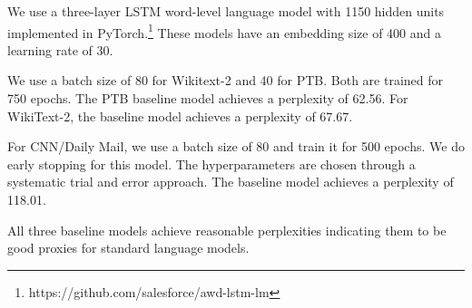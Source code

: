 \documentclass[11pt,a4paper]{article}
\begin{document}
We use a three-layer LSTM word-level language model \citep[AWD-LSTM;][]{merity2017} with 1150 hidden units implemented in PyTorch.\footnote{https://github.com/salesforce/awd-lstm-lm} These models have an embedding size of 400 and a learning rate of 30. 

We use a batch size of 80 for Wikitext-2 and 40 for PTB. Both are trained for 750 epochs. The PTB baseline model achieves a perplexity of 62.56. For WikiText-2, the baseline model achieves a  perplexity of 67.67. 

For CNN/Daily Mail, we use a batch size of 80 and train it for 500 epochs. We do early stopping for this model. The hyperparameters are chosen through a systematic trial and error approach. The baseline model achieves a perplexity of 118.01. 

All three baseline models achieve reasonable perplexities indicating them to be good proxies for standard language models. %
\end{document}
